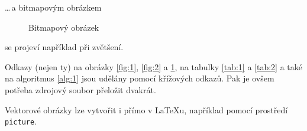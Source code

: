 \documentclass[11pt]{article}
\begin{document}
\bigskip
\noindent \dots\,a bitmapovým obrázkem
\begin{figure}[h]
    \centering
    \caption{Bitmapový obrázek}
    \label{fig:3}
\end{figure}
\bigskip

\noindent se projeví například při zvětšení.

Odkazy (nejen ty) na obrázky \ref{fig:1}, \ref{fig:2} a \ref{fig:3}, na tabulky \ref{tab:1} a \ref{tab:2} a také na algoritmus \ref{alg:1} jsou udělány pomocí křížových odkazů. 
Pak je ovšem potřeba zdrojový soubor přeložit dvakrát.

Vektorové obrázky lze vytvořit i přímo v \LaTeX u, například pomocí prostředí \texttt{ picture}.
\newpage
\end{document}
